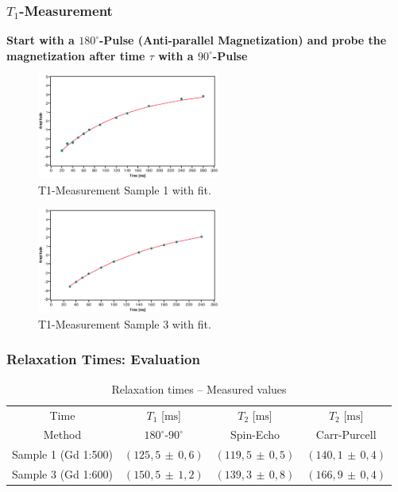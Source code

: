 \documentclass[aspectratio=169]{beamer}
\newcommand{\err}[2]{( #1 \, \pm \, #2 )}
\begin{document}
\begin{frame}
	\frametitle{$T_1$-Measurement}
	\textbf{Start with a $180^\circ$-Pulse (Anti-parallel Magnetization) and probe the magnetization after time $\tau$ with a $90^\circ$-Pulse}
	
	\pause
	\begin{minipage}[t]{0.45\textwidth}
		\centering
		\begin{figure}
			\includegraphics[width=60mm]{./Resources/t1_meas_p1.eps}
			\caption{T1-Measurement Sample 1 with fit.}
			\label{fig:t1_p1}
		\end{figure}
	\end{minipage}
	\hfill
	\begin{minipage}[t]{0.45\textwidth}
		\centering
		\begin{figure}
			\includegraphics[width=60mm]{./Resources/t1_meas_p3.eps}
			\caption{T1-Measurement Sample 3 with fit.}
			\label{fig:t1_p3}
		\end{figure}
	\end{minipage}
\end{frame}

\begin{frame}
	\frametitle{Relaxation Times: Evaluation}
	\begin{table}[H] 
		\centering
		\caption{Relaxation times -- Measured values}
		\label{tab:relaxtimes}
		\begin{tabular}{cccc}
			\toprule
			Time & $T_1$ [$\mathrm{ms}$] & $T_2$ [$\mathrm{ms}$] & $T_2$ [$\mathrm{ms}$]\\
			Method & $180^\circ$-$90^\circ$ & Spin-Echo & Carr-Purcell\\
			\midrule
			Sample 1 (Gd 1:500)& $\err{125,5}{0,6}$ & $\err{119,5}{0,5}$ & $\err{140,1}{0,4}$\\
			Sample 3 (Gd 1:600)& $\err{150,5}{1,2}$ & $\err{139,3}{0,8}$ & $\err{166,9}{0,4}$\\
			\bottomrule
		\end{tabular}
	\end{table}
	
\end{frame}
\end{document}
